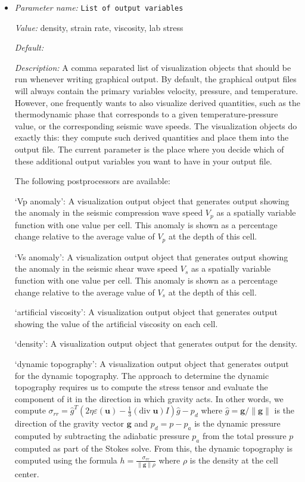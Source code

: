 \begin{itemize}
{\it Possible values:} [Bool]
\item {\it Parameter name:} {\tt List of output variables}
\label{parameters:Postprocess/Visualization/List of output variables}


{\it Value:} density, strain rate, viscosity, lab stress


{\it Default:} 


{\it Description:} A comma separated list of visualization objects that should be run whenever writing graphical output. By default, the graphical output files will always contain the primary variables velocity, pressure, and temperature. However, one frequently wants to also visualize derived quantities, such as the thermodynamic phase that corresponds to a given temperature-pressure value, or the corresponding seismic wave speeds. The visualization objects do exactly this: they compute such derived quantities and place them into the output file. The current parameter is the place where you decide which of these additional output variables you want to have in your output file.

The following postprocessors are available:

`Vp anomaly': A visualization output object that generates output showing the anomaly in the seismic compression wave speed $V_p$ as a spatially variable function with one value per cell. This anomaly is shown as a percentage change relative to the average value of $V_p$ at the depth of this cell.

`Vs anomaly': A visualization output object that generates output showing the anomaly in the seismic shear wave speed $V_s$ as a spatially variable function with one value per cell. This anomaly is shown as a percentage change relative to the average value of $V_s$ at the depth of this cell.

`artificial viscosity': A visualization output object that generates output showing the value of the artificial viscosity on each cell.

`density': A visualization output object that generates output for the density.

`dynamic topography': A visualization output object that generates output for the dynamic topography. The approach to determine the dynamic topography requires us to compute the stress tensor and evaluate the component of it in the direction in which gravity acts. In other words, we compute $\sigma_{rr}={\hat g}^T(2 \eta \varepsilon(\mathbf u)-\frac 13 (\textrm{div}\;\mathbf u)I)\hat g - p_d$ where $\hat g = \mathbf g/\|\mathbf g\|$ is the direction of the gravity vector $\mathbf g$ and $p_d=p-p_a$ is the dynamic pressure computed by subtracting the adiabatic pressure $p_a$ from the total pressure $p$ computed as part of the Stokes solve. From this, the dynamic topography is computed using the formula $h=\frac{\sigma_{rr}}{\|\mathbf g\| \rho}$ where $\rho$ is the density at the cell center.


\end{itemize}
